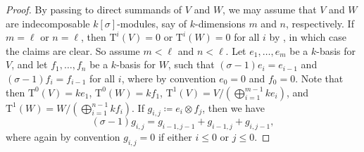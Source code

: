 \documentclass[reqno]{amsart}
\numberwithin{equation}{subsection}
\DeclareRobustCommand{\sean}[1]{{\color{red}\sffamily $\heartsuit\heartsuit\heartsuit$ SEAN: [#1]}}
\newcommand{\rT}{\ensuremath{\mathrm{T}}\xspace}
\theoremstyle{remark}
\numberwithin{equation}{subsection}
\numberwithin{figure}{subsection}
\begin{document}
\begin{proof}
By passing to direct summands of $V$ and $W$, we may assume that $V$ and $W$ are indecomposable $k[\sigma]$-modules, say of $k$-dimensions $m$ and $n$, respectively. If $m = \ell$ or $n = \ell$, then $\rT^i(V) = 0$ or $\rT^i(W) = 0$ for all $i$ by \cite[Lemma~3.1.3]{Cot26b}, in which case the claims are clear. So assume $m < \ell$ and $n < \ell$. Let $e_1, \dots, e_m$ be a $k$-basis for $V$, and let $f_1, \dots, f_n$ be a $k$-basis for $W$, such that $(\sigma - 1)e_i = e_{i-1}$ and $(\sigma - 1)f_i = f_{i-1}$ for all $i$, where by convention $e_0 = 0$ and $f_0 = 0$. Note that then $\rT^0(V) = ke_1$, $\rT^0(W) = kf_1$, $\rT^1(V) = V/(\bigoplus_{i=1}^{m-1} ke_i)$, and $\rT^1(W) = W/(\bigoplus_{i=1}^{n-1} kf_i)$. If $g_{i,j} \coloneqq e_i \otimes f_j$, then we have
\begin{equation}\label{eqn:g-relation}
(\sigma - 1)g_{i,j} = g_{i-1,j-1} + g_{i-1,j} + g_{i,j-1},
\end{equation}
where again by convention $g_{i,j} = 0$ if either $i\leq 0$ or $j\leq 0$. %




\end{proof}
\end{document}
